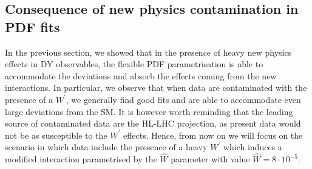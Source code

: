 \documentclass[withindex,glossary]{cam-thesis}
\begin{document}
\subsection{Consequence of new physics contamination in PDF fits}
\label{sec:projections}
In the previous section, we showed that in the presence of heavy new physics effects in 
DY observables, the flexible PDF parametrisation is able to accommodate the deviations
and absorb the effects coming from the new interactions. In particular, we observe that when
data are contaminated with the presence of a $W^\prime$, we generally find good fits and are able to accommodate
even large deviations from the SM. It is however worth reminding that
the leading source of contaminated data are the HL-LHC projection, as present data would not be as susceptible to the $W^\prime$ effects.
Hence, from now on we will focus on the scenario in which data include the presence of a heavy $W^\prime$ which induces 
a modified interaction parametrised by the $\hat{W}$ parameter with value $\hat{W}=8\cdot 10^{-5}$.
\end{document}
